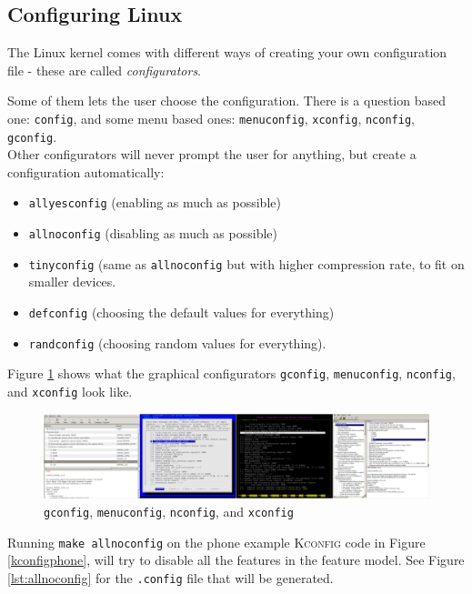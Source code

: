 \documentclass[a4paper,11pt]{report}
\newcommand{\textcode}[1]{
    \fboxsep=1pt
    \texttt{\colorbox{gray!20}{#1}}
}
\newcommand{\figa}{
    \begin{figure}[!htpb]
    \centering
}
\newcommand{\figb}[2]{
    \caption{#1}
    \label{#2}
    \end{figure}
}
\begin{document}
            \subsection{Configuring Linux}
            \label{sec:conf}

The Linux kernel comes with different ways of creating your own configuration 
file - these are called \emph{configurators}. 

Some of them lets the user choose the configuration. There is a question based 
one: \texttt{config}, and some menu based ones: \texttt{menuconfig}, 
\texttt{xconfig}, \texttt{nconfig}, \texttt{gconfig}.
\\

Other configurators will 
never prompt the user for anything, but create a configuration automatically: 
\begin{itemize}
    \item \texttt{allyesconfig} (enabling as much as possible) 
    \item \texttt{allnoconfig} (disabling as much as possible)
    \item \texttt{tinyconfig} (same as \texttt{allnoconfig} but with higher 
    compression rate, to fit on smaller devices.
    \item \texttt{defconfig} (choosing the default values for everything)
    \item \texttt{randconfig} (choosing random values for everything).
\end{itemize}

Figure \ref{fig:lineofconfigs} shows what the graphical 
configurators \texttt{gconfig}, \texttt{menuconfig}, \texttt{nconfig}, and 
\texttt{xconfig} look like.
\\


\figa
    \includegraphics[scale=0.25]{pngs/configs50percent.png}
\figb{\texttt{gconfig}, \texttt{menuconfig}, \texttt{nconfig}, and 
    \texttt{xconfig}}{fig:lineofconfigs}


Running \textcode{make allnoconfig} on the phone example \textsc{Kconfig} code
in Figure \ref{kconfigphone}, will try to disable all the features in the 
feature model. See Figure \ref{lst:allnoconfig} for the \texttt{.config} file that 
will be generated.
\\
\end{document}
